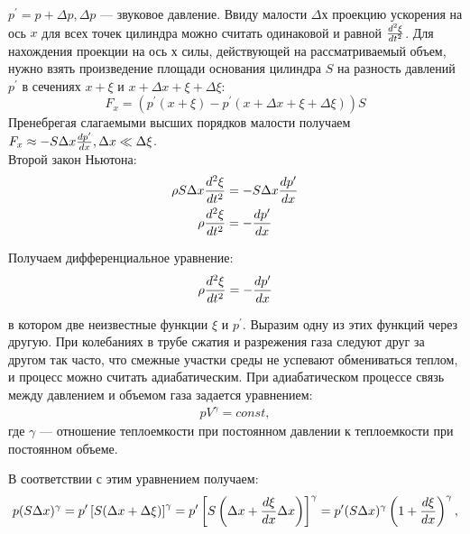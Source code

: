 $p^{\prime} = p + \Delta p, \Delta p \text{ --- звуковое давление.}$
Ввиду малости $\Delta  х$  проекцию ускорения на ось $x$
для всех точек цилиндра можно считать одинаковой и равной $\dv[2]{\xi}{t}$. Для нахождения проекции на ось $х$ силы, действующей на рассматриваемый объем, нужно взять произведение площади основания цилиндра $S$ на разность давлений $p^{\prime}$ в сечениях $x + \xi$ и $x + \Delta x + \xi + \Delta\xi$:
\begin{equation}
    F_{x} = \left( p^{\prime} (x + \xi) - p^{\prime}(x + \Delta x + \xi + \Delta\xi)\right)S
\end{equation}
Пренебрегая слагаемыми высших порядков малости получаем $F_{x} \approx -S\Delta x \dv{p^{\prime}}{x}, \Delta x \ll \Delta \xi$.\\
Второй закон Ньютона:
\begin{align}
    \rho S \Delta x \dv[2]{\xi}{t} &= -S\Delta x \dv{p^{\prime}}{x} \\
    \rho\dv[2]{\xi}{t} &= -\dv{p^{\prime}}{x}
\end{align}

Получаем дифференциальное уравнение:
\begin{equation}
    \rho\dv[2]{\xi}{t} = -\dv{p^{\prime}}{x}    
\end{equation}

в котором две неизвестные функции $\xi$ и $p^{\prime}$. Выразим одну из этих функций через другую. При колебаниях в трубе сжатия и разрежения газа следуют друг за другом так часто, что смежные участки среды не успевают обмениваться теплом, и процесс можно считать адиабатическим. При адиабатическом процессе связь между давлением и объемом газа задается уравнением:
\begin{align}
    pV^{\gamma} = const,
\end{align}
где $\gamma$ --- отношение теплоемкости при постоянном давлении к теплоемкости при постоянном объеме.

В соответствии с этим уравнением получаем:
\begin{equation}
    p(S\Delta x)^{\gamma} = p^{\prime}\left[ S(\Delta x + \Delta \xi)\right]^{\gamma} = p^{\prime}\left[ S \left(\Delta x + \dv{\xi}{x}\Delta x\right) \right]^{\gamma} = p^{\prime}(S \Delta x)^{\gamma} \left( 1 + \dv{\xi}{x}\right)^{\gamma},
\end{equation}

